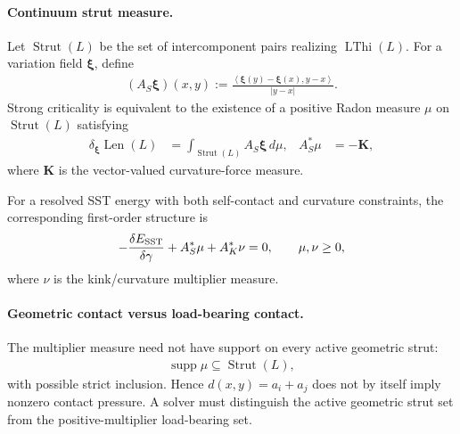     \paragraph{Continuum strut measure.}
    Let \(\operatorname{Strut}(L)\) be the set of intercomponent pairs realizing
    \(\operatorname{LThi}(L)\).  For a variation field \(\boldsymbol\xi\), define
    \begin{align}
        (A_S\boldsymbol\xi)(x,y)
        :=
        \frac{
        \left\langle
        \boldsymbol\xi(y)-\boldsymbol\xi(x),y-x
        \right\rangle
        }{|y-x|}.
        \label{eq:rt_gehring_rigidity_operator}
    \end{align}
    Strong criticality is equivalent to the existence of a positive Radon measure
    \(\mu\) on \(\operatorname{Strut}(L)\) satisfying
    \begin{align}
        \delta_{\boldsymbol\xi}\operatorname{Len}(L)
        &=
        \int_{\operatorname{Strut}(L)}
        A_S\boldsymbol\xi\,d\mu,
        &
        A_S^*\mu&=-\mathbf K,
        \label{eq:rt_gehring_continuum_balance}
    \end{align}
    where \(\mathbf K\) is the vector-valued curvature-force measure.

    For a resolved SST energy with both self-contact and curvature constraints, the
    corresponding first-order structure is
    \begin{align}
        -\frac{\delta E_{\rm SST}}{\delta\gamma}
        +
        A_S^*\mu
        +
        A_K^*\nu
        =0,
        \qquad
        \mu,\nu\geq0,
        \label{eq:rt_sst_measure_kkt_balance}
    \end{align}
    where \(\nu\) is the kink/curvature multiplier measure.

    \paragraph{Geometric contact versus load-bearing contact.}
    The multiplier measure need not have support on every active geometric strut:
    \begin{align}
        \operatorname{supp}\mu
        \subseteq
        \operatorname{Strut}(L),
        \label{eq:rt_load_bearing_strut_subset}
    \end{align}
    with possible strict inclusion.  Hence
    \(d(x,y)=a_i+a_j\) does not by itself imply nonzero contact pressure.  A solver
    must distinguish the active geometric strut set from the positive-multiplier
    load-bearing set.

